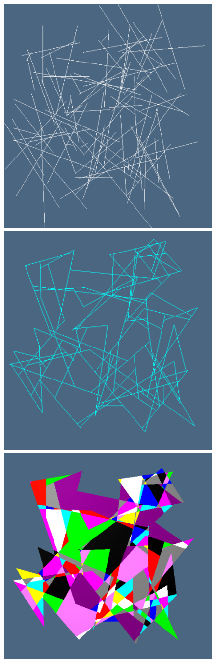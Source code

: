 \documentclass[11pt,oneside]{article}    %
\begin{document}
\begin{figure}[htbp] %
   \centering
   \includegraphics[height=0.325\linewidth,width=0.325\linewidth]{images/random2d0} 
   \includegraphics[height=0.325\linewidth,width=0.325\linewidth]{images/random2d1} 
   \includegraphics[height=0.325\linewidth,width=0.325\linewidth]{images/random2d2} 


\end{figure}
\end{document}
